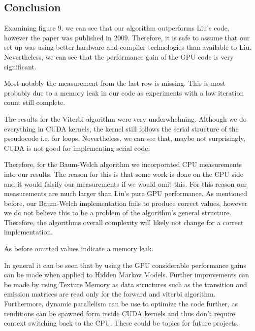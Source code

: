 \documentclass[english, paper=a4]{scrartcl}
\begin{document}
\subsection{Conclusion}

Examining figure 9. we can see that our algorithm outperforms Liu's code, however the paper was published in 2009. Therefore, it is safe to assume that our set up was using better hardware and compiler technologies than available to Liu. Nevertheless, we can see that the performance gain of the GPU code is very significant.

Most notably the measurement from the last row is missing. This is most probably due to a memory leak in our code as experiments with a low iteration count still complete.

The results for the Viterbi algorithm were very underwhelming. Although we do everything in CUDA kernels, the kernel still follows the serial structure of the pseudocode i.e. for loops. Nevertheless, we can see that, maybe not surprisingly, CUDA is not good for implementing serial code.

Therefore, for the Baum-Welch algorithm we incorporated CPU measurements into our results. The reason for this is that some work is done on the CPU side and it would falsify our measurements if we would omit this. For this reason our measurements are much larger than Liu's pure GPU performance. As mentioned before, our Baum-Welch implementation fails to produce correct values, however we do not believe this to be a problem of the algorithm's general structure. Therefore, the algorithms overall complexity will likely not change for a correct implementation.

As before omitted values indicate a memory leak.

In general it can be seen that by using the GPU considerable performance gains can be made when applied to Hidden Markov Models. Further improvements can be made by using Texture Memory \cite{cuhmm} as data structures such as the transition and emission matrices are read only for the forward and viterbi algorithm. Furthermore, dynamic parallelism can be use to optimize the code further, as renditions can be spawned form inside CUDA kernels and thus don't require context switching back to the CPU. These could be topics for future projects.








\newpage
\end{document}
